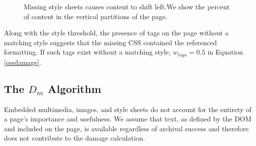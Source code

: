 \begin{figure}[h!]
  \begin{center}
    \qquad
  \end{center}
  \label{full}
  \caption{Missing style sheets causes content to shift left.We show the percent of content in the vertical partitions of the page.}
\end{figure}


Along with the style threshold, the presence of tags on the page without a matching style suggests that the missing CSS contained the referenced formatting. If such tags exist without a matching style, $w_{tags}=0.5$ in Equation \ref{cssdamage}. 

\subsection{The $D_m$ Algorithm}
Embedded multimedia, images, and style sheets do not account for the entirety of a page's importance and usefulness. We assume that text, as defined by the DOM and included on the page, is available regardless of archival success and therefore does not contribute to the damage calculation.

